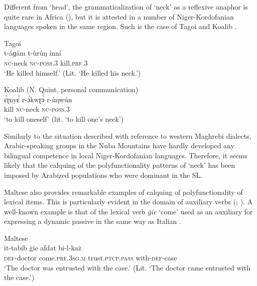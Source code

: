 \documentclass[output=paper]{langsci/langscibook}
\begin{document}
Different from ‘head’, the grammaticalization of ‘neck’ as a reflexive anaphor is quite rare in Africa (\citealt[50]{Heine2011}), but it is attested in a number of Niger-Kordofanian languages spoken in the same region. Such is the case of Tagoi  and Koalib . 

\ea\label{ex:key:21}
{Tagoi \citep[26]{Alamin2015}}\\
\gll   t-áɡám t-ùrúŋ ínní\\
       \textsc{nc}-neck \textsc{nc}-\textsc{poss.3} kill.\textsc{prf.3}\\
\glt   `He killed himself.' (Lit. ‘He killed his neck.’)
\z

\ea\label{ex:key:22}
{Koalib (N. Quint, personal communication)} \\
\gll   ɛ̀ɽnyɛ́ r-ɔ́kwɽɔ̀ r-ùŋwún\\
       kill \textsc{nc}-neck \textsc{nc-poss.3}\\
\glt   `to kill oneself' (lit. ‘to kill one's neck’)
\z

Similarly to the situation described with reference to western Maghrebi dialects, Arabic-speaking groups in the Nuba Mountains have hardly developed any bilingual competence in local Niger-Kordofanian languages. Therefore, it seems likely that the calquing of the polyfunctionality patterns of ‘neck’ has been imposed by Arabized populations who were dominant in the SL. 

Maltese also provides remarkable examples of calquing of polyfunctionality of lexical items. This is particularly evident in the domain of auxiliary verbs (\citealt{Vanhove1993}; \citealt{VanhoveCaubet2009}). A well-known example is that of the lexical verb \textit{\.gie} ‘come’ used as an auxiliary for expressing a dynamic passive  in the same way as Italian .

\ea\label{ex:key:23}
{Maltese \citep[214]{BorgAzzopardi-Alexander1997}}\\
\gll   it-tabib \.gie afdat bi-l-każ\\
       \textsc{def}-doctor come.\textsc{prf.3sg.m} trust.\textsc{ptcp.pass} with-\textsc{def}-case\\
\glt   `The doctor was entrusted with the case.' (Lit. ‘The doctor came entrusted with the case.’)
\z

\end{document}
